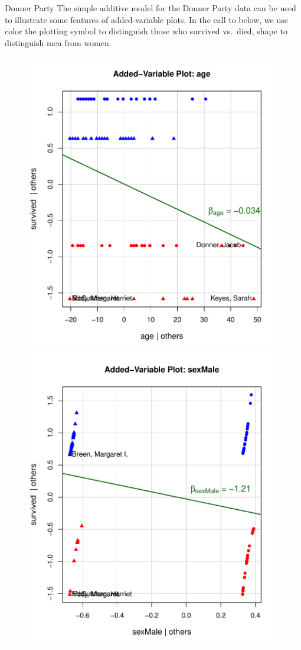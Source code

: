 \documentclass[11pt]{book}
\renewenvironment{knitrout}{\small\renewcommand{\baselinestretch}{.85}}{} %
\begin{document}
\begin{Example}[donner4]{Donner Party}
The simple additive model  for the Donner Party data can be used to illustrate
some features of added-variable plots.  In the call to  below, we use
color  the plotting symbol to distinguish those who survived vs.\ died,
shape to distinguish men from women.

\begin{knitrout}
\color{fgcolor}\begin{kframe}
\begin{alltt}
 \hlkwb{<-} \hlopt{$}\hlopt{==}\hlstd{,} \hlstd{,} \hlstd{)}
 \hlkwb{<-} \hlopt{$}\hlopt{==}\hlstd{,} \hlstd{,} \hlstd{)}
 \hlstd{=}\hlstd{,}   \hlstd{=}\hlstd{)}
\end{alltt}
\end{kframe}
\end{knitrout}

\begin{knitrout}
\color{fgcolor}\begin{figure}[!htbp]


\centerline{\includegraphics[width=.5\textwidth]{ch07/fig/donner4-avp1} 
\includegraphics[width=.5\textwidth]{ch07/fig/donner4-avp2} }


\end{figure}
\end{knitrout}
\end{Example}
\end{document}
